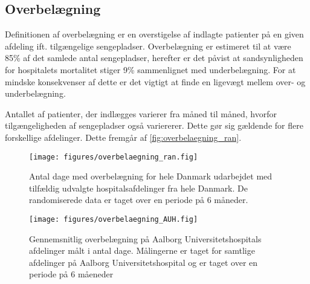 \subsection{Overbelægning}
Definitionen af overbelægning er en overstigelse af indlagte patienter på en given afdeling ift. tilgængelige sengepladser. Overbelægning er estimeret til at være 85\% af det samlede antal sengepladser, herefter er det påvist at sandsynligheden for hospitalets mortalitet  stiger 9\% sammenlignet med underbelægning. \citep{dodlighed2014} For at mindske konsekvenser af dette er det vigtigt at finde en ligevægt mellem over- og underbelægning.  

\noindent
Antallet af patienter, der indlægges varierer fra måned til måned, hvorfor tilgængeligheden af sengepladser også variererer. Dette gør sig gældende for flere forskellige afdelinger. Dette fremgår af \autoref{fig:overbelaegning_ran}.

\begin{figure}[H]
\centering
\texttt{[image: figures/overbelaegning\_ran.fig]}
\caption{Antal dage med overbelægning for hele Danmark udarbejdet med tilfældig udvalgte hospitalsafdelinger fra hele Danmark. De randomiserede data er taget over en periode på 6 måneder.}
\label{fig:overbelaegning_ran}
\end{figure}


\begin{figure}[H]
\centering
\texttt{[image: figures/overbelaegning\_AUH.fig]}
\caption{Gennemsnitlig overbelægning på Aalborg Universitetshospitals afdelinger målt i antal dage. Målingerne er taget for samtlige afdelinger på Aalborg Universitetshospital og er taget over en periode på 6 måeneder}
\label{fig:overbelaegning_AUH}
\end{figure}